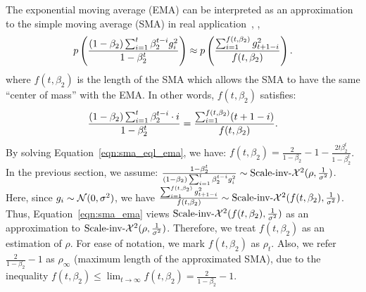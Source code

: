 The exponential moving average (EMA) can be interpreted as an approximation to the simple moving average (SMA) in real application~\citep{nau2014forecasting}, \ie, 
\begin{align}
\vspace{-0.2in}
p\left(\frac{(1 - \beta_2)\sum_{i = 1}^t \beta_2^{t-i}g_i^2}{1-\beta_2^t} \right) \approx p\left(\frac{\sum_{i = 1}^{f(t, \beta_2)} g_{t+1-i}^2}{f(t, \beta_2)}\right).
\label{eqn:sma_ema}
\vspace{-0.2in}
\end{align}
where $f(t, \beta_2)$ is the length of the SMA which allows the SMA to have the same ``center of mass'' with the EMA.
In other words, $f(t, \beta_2)$ satisfies:
\begin{align}
\vspace{-0.7in}
\frac{(1 - \beta_2)\sum_{i = 1}^t \beta_2^{t-i} \cdot i }{1-\beta_2^t} = \frac{\sum_{i = 1}^{f(t, \beta_2)} (t+1-i)}{f(t, \beta_2)}.
\label{eqn:sma_eql_ema}
\vspace{-0.7in}
\end{align}
By solving Equation~\ref{eqn:sma_eql_ema}, we have:
$f(t, \beta_2) = \frac{2}{1 - \beta_2} - 1 - \frac{2 t \beta_2^t}{1 - \beta_2^t}$.
In the previous section, we assume: $\frac{1-\beta_2^t}{(1 - \beta_2)\sum_{i = 1}^t \beta_2^{t-i}g_i^2} \sim \mbox{Scale-inv-}\mathcal{X}^2(\rho, \frac{1}{\sigma^2})$. 
Here, since $g_i \sim {\mathcal{N}}(0, \sigma^2)$, we have $\frac{\sum_{i = 1}^{f(t, \beta_2)} g_{t+1-i}^2}{f(t, \beta_2)} \sim  \mbox{Scale-inv-}\mathcal{X}^2(f(t, \beta_2), \frac{1}{\sigma^2})$. 
Thus, Equation~\ref{eqn:sma_ema} views $\mbox{Scale-inv-}\mathcal{X}^2(f(t, \beta_2), \frac{1}{\sigma^2})$ as an approximation to $\mbox{Scale-inv-}\mathcal{X}^2(\rho, \frac{1}{\sigma^2})$.
Therefore, we treat $f(t, \beta_2)$ as an estimation of $\rho$. 
For ease of notation, we mark $f(t, \beta_2)$ as $\rho_t$. Also, we refer $\frac{2}{1 - \beta_2} - 1$ as $\rho_\infty$ (maximum length of the approximated SMA), due to the inequality $f(t, \beta_2) \leq \lim_{t \to \infty} f(t, \beta_2) = \frac{2}{1 - \beta_2} - 1$.


